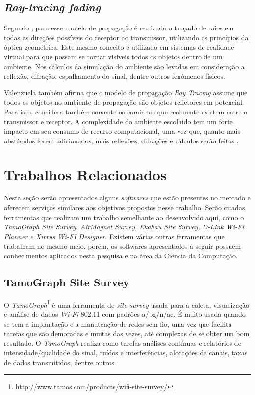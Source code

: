 \documentclass[
	12pt,				%
	twoside,			%
	a4paper,			%
	english,			%
	french,				%
	spanish,			%
	brazil				%
	]{abntex2}
\begin{document}
\subsection{\texorpdfstring{\emph{Ray-tracing
fading}}{Ray-tracing fading}}\label{sec:ray_tracing}

Segundo \cite{VALENZUELA}, para esse modelo de propagação é realizado o
traçado de raios em todas as direções possíveis do receptor ao
transmissor, utilizando os princípios da óptica geométrica. Este mesmo
conceito é utilizado em sistemas de realidade virtual para que possam se
tornar visíveis todos os objetos dentro de um ambiente. Nos cálculos da
simulação do ambiente são levadas em consideração a reflexão, difração,
espalhamento do sinal, dentre outros fenômenos físicos.

Valenzuela também afirma que o modelo de propagação \emph{Ray Tracing}
assume que todos os objetos no ambiente de propagação são objetos
refletores em potencial. Para isso, considera também somente os caminhos
que realmente existem entre o transmissor e receptor. A complexidade do
ambiente escolhido tem um forte impacto em seu consumo de recurso
computacional, uma vez que, quanto mais obstáculos forem adicionados,
mais reflexões, difrações e cálculos serão feitos \cite{VALENZUELA}.

\section{Trabalhos Relacionados}\label{trabalhos-relacionados}

Nesta seção serão apresentados alguns \emph{softwares} que estão
presentes no mercado e oferecem serviços similares aos objetivos
propostos nesse trabalho. Serão citadas ferramentas que realizam um
trabalho semelhante ao desenvolvido aqui, como o \emph{TamoGraph Site
Survey, AirMagnet Survey, Ekahau Site Survey, D-Link Wi-Fi Planner e
Xirrus Wi-FI Designer}. Existem várias outras ferramentas que trabalham
no mesmo meio, porém, os softwares apresentados a seguir possuem
conhecimentos aplicados nesta pesquisa e na área da Ciência da
Computação.

\subsection{TamoGraph Site Survey}\label{tamograph-site-survey}

O \emph{TamoGraph}\footnote{\url{http://www.tamos.com/products/wifi-site-survey/}}
é uma ferramenta de \emph{site survey} usada para a coleta, visualização
e análise de dados \emph{Wi-Fi} 802.11 com padrões a/bg/n/ac. É muito
usada quando se tem a implantação e a manutenção de redes sem fio, uma
vez que facilita tarefas que são demoradas e muitas das vezes, até
complexas de se obter um bom resultado. O \emph{TamoGraph} realiza como
tarefas análises contínuas e relatórios de intensidade/qualidade do
sinal, ruídos e interferências, alocações de canais, taxas de dados
transmitidos, dentre outros.
\end{document}
